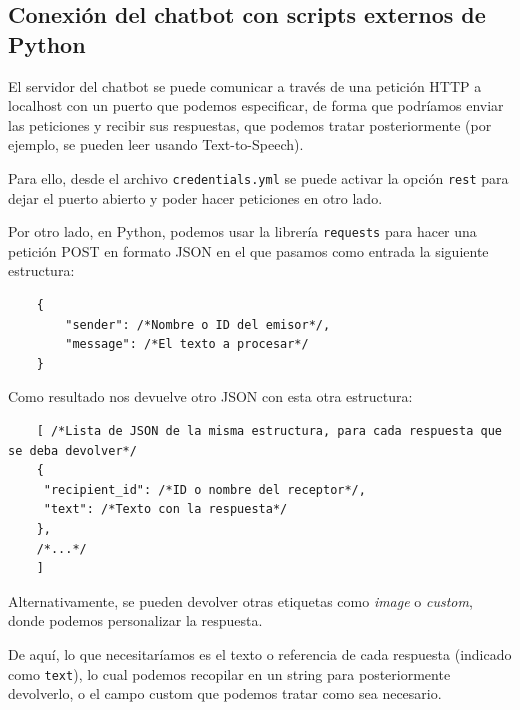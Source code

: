 \subsection{Conexión del chatbot con scripts externos de Python}
El servidor del chatbot se puede comunicar a través de una petición HTTP a localhost con un puerto que podemos especificar, de forma que podríamos enviar las peticiones y recibir sus respuestas, que podemos tratar posteriormente (por ejemplo, se pueden leer usando Text-to-Speech).

Para ello, desde el archivo \texttt{credentials.yml} se puede activar la opción \texttt{rest} para dejar el puerto abierto y poder hacer peticiones en otro lado.

Por otro lado, en Python, podemos usar la librería \texttt{requests} para hacer una petición POST en formato JSON en el que pasamos como entrada la siguiente estructura:


\begin{lstlisting}
	{
		"sender": /*Nombre o ID del emisor*/,
		"message": /*El texto a procesar*/
	}
\end{lstlisting}

Como resultado nos devuelve otro JSON con esta otra estructura:

\begin{lstlisting}
	[ /*Lista de JSON de la misma estructura, para cada respuesta que se deba devolver*/
	{
	 "recipient_id": /*ID o nombre del receptor*/,
	 "text": /*Texto con la respuesta*/
 	}, 
	/*...*/
	]
\end{lstlisting}

Alternativamente, se pueden devolver otras etiquetas como \textit{image} o \textit{custom}, donde podemos personalizar la respuesta.

De aquí, lo que necesitaríamos es el texto o referencia de cada respuesta (indicado como \texttt{text}), lo cual podemos recopilar en un string para posteriormente devolverlo, o el campo custom que podemos tratar como sea necesario.


